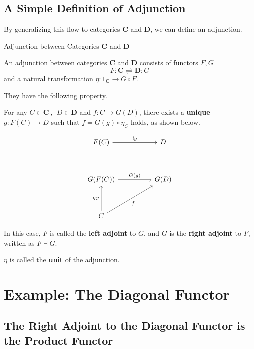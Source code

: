 \documentclass[uplatex,a4j,12pt,dvipdfmx]{jsarticle}
\begin{document}
\subsection{A Simple Definition of Adjunction}

By generalizing this flow to categories $\mathbf{C}$ and $\mathbf{D}$, we can define an adjunction.


\begin{itembox}[l]{Adjunction between Categories $\mathbf{C}$ and $\mathbf{D}$}

	An adjunction between categories $\mathbf{C}$ and $\mathbf{D}$ consists of functors $F,G$
	$$
		F : \mathbf{C} \rightleftharpoons \mathbf{D}: G
	$$
	and a natural transformation
	$\eta: 1_{\mathbf{C}} \to G \circ F$.

	They have the following property.

	For any
	$C \in \mathbf{C} \ , \ \ D \in \mathbf{D}$
	and
	$f: C \to G(D)$,
	there exists a \textbf{unique} $g: F(C) \to D$ such that
	$f = G(g) \circ \eta_{C}$
	holds, as shown below.

	\[
		\begin{tikzcd}
			F(C) \arrow[rr, "!g"] & & D \\
			& & \\
			G(F(C)) \arrow[rr, "G(g)"] & & G(D) \\
			& & \\
			C \arrow[rruu, "f"'] \arrow[uu, "\eta_{C}"] & &
		\end{tikzcd}
	\]

\end{itembox}

In this case, $F$ is called the \textbf{left adjoint} to $G$, and $G$ is the \textbf{right adjoint} to $F$, written as $F \dashv G$.

$\eta$ is called the \textbf{unit} of the adjunction.



\section{Example: The Diagonal Functor}

\subsection{The Right Adjoint to the Diagonal Functor is the Product Functor}
\end{document}
